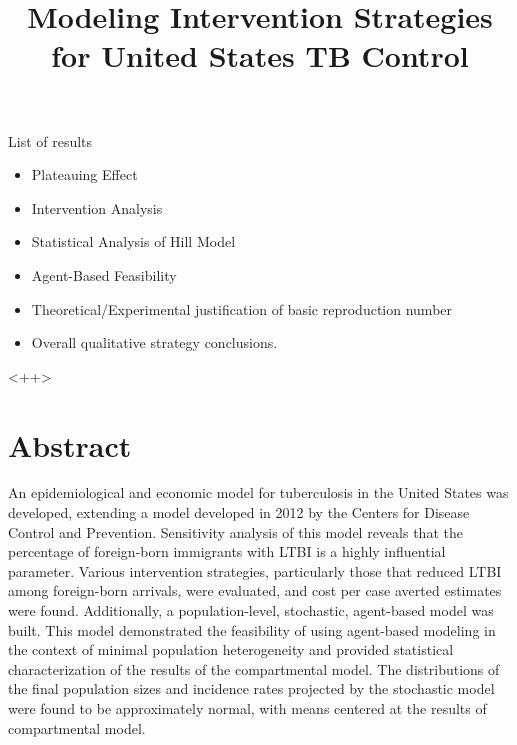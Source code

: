 \documentclass{amsart}
\title{Modeling Intervention Strategies for United States TB Control}
\begin{document}
\maketitle

{\huge \color{red} List of results}
\begin{itemize}
  \item Plateauing Effect
  \item Intervention Analysis
  \item Statistical Analysis of Hill Model
  \item Agent-Based Feasibility
  \item Theoretical/Experimental justification of basic reproduction number
  \item Overall qualitative strategy conclusions. 
\end{itemize}<++>

\section{Abstract}
An epidemiological and economic model for tuberculosis in the United States
 was developed, extending a model developed in 2012 by the Centers
for Disease Control and Prevention. Sensitivity analysis of this model reveals
that the percentage of foreign-born immigrants with LTBI is a highly influential
parameter. Various intervention strategies, particularly those that reduced LTBI
among foreign-born arrivals, were evaluated, and cost per case averted estimates
were found.  Additionally, a population-level, stochastic, agent-based model was
built. This model demonstrated the feasibility of using agent-based modeling in
the context of minimal population heterogeneity and provided statistical
characterization of the results of the compartmental model. The distributions
of the final population sizes and incidence rates projected by the stochastic model
were found to be approximately normal, with means centered at the results of
compartmental model.  
\end{document}
